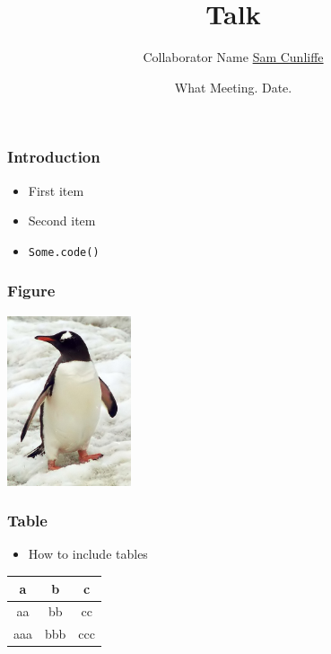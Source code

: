 \documentclass[9pt]{beamer}
\title{Talk}
\author[S.Cunliffe]{
    Collaborator Name
    \underline{Sam Cunliffe}
}
\institute[Imperial]{Imperial College London}
\date{What Meeting. \hfill Date.}
\begin{document}
    

    \begin{frame}[containsverbatim]\frametitle{Introduction}
      \begin{itemize}
        \item First item
        \item Second item
        \item \verb?Some.code()?
      \end{itemize}
    \end{frame}

    \begin{frame}\frametitle{Figure}
      \includegraphics[height=5cm]{figs/penguin.jpg}
    \end{frame}

    \begin{frame}\frametitle{Table}
      \begin{itemize}
        \item How to include tables
      \end{itemize}
      \begin{tabular}{|c|c|c|}
        \hline
        a & b & c \\
        \hline
        aa & bb & cc \\
        aaa & bbb & ccc \\
        \hline
      \end{tabular}
    \end{frame}
\end{document}
